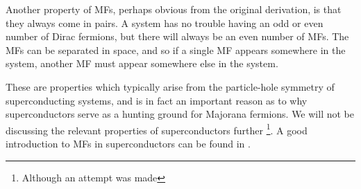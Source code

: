 Another property of MFs, perhaps obvious from the original derivation, is that they always come in pairs. A system has no trouble having an odd or even number of Dirac fermions, but there will always be an even number of MFs. The MFs can be separated in space, and so if a single MF appears somewhere in the system, another MF must appear somewhere else in the system. \cite{leijnseIntroductionTopologicalSuperconductivity2012} \cite{beenakkerSearchMajoranaFermions2013}

These are properties which typically arise from the particle-hole symmetry of superconducting systems, and is in fact an important reason as to why superconductors serve as a hunting ground for Majorana fermions. We will not be discussing the relevant properties of superconductors further \footnote{Although an attempt was made}. A good introduction to MFs in superconductors can be found in \cite{nayakNonAbelianAnyonsTopological2008}.




